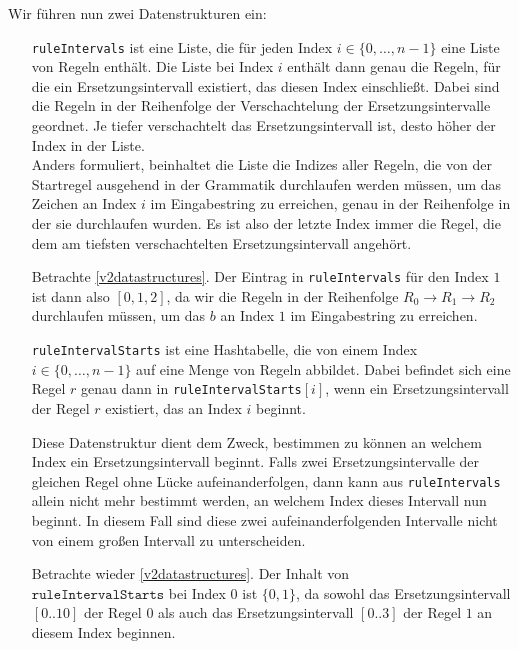 Wir führen nun zwei Datenstrukturen ein: 
\begin{itemize}[leftmargin=10em]
	\item[\texttt{ruleIntervals}] ist eine Liste, die für jeden Index $i \in \{0, \dots, n - 1\}$ eine Liste von Regeln enthält. Die Liste bei Index $i$ enthält dann genau die Regeln, für die ein Ersetzungsintervall existiert, das diesen Index einschließt. Dabei sind die Regeln in der Reihenfolge der Verschachtelung der Ersetzungsintervalle geordnet. Je tiefer verschachtelt das Ersetzungsintervall ist, desto höher der Index in der Liste.\\ 
	Anders formuliert, beinhaltet die Liste die Indizes aller Regeln, die von der Startregel ausgehend in der Grammatik durchlaufen werden müssen, um das Zeichen an Index $i$ im Eingabestring zu erreichen, genau in der Reihenfolge in der sie durchlaufen wurden. Es ist also der letzte Index immer die Regel, die dem am tiefsten verschachtelten Ersetzungsintervall angehört. 
	
	Betrachte \autoref{v2datastructures}. Der Eintrag in \texttt{ruleIntervals} für den Index $1$ ist dann also $[0, 1, 2]$, da wir die Regeln in der Reihenfolge $R_0 \rightarrow R_1 \rightarrow R_2$ durchlaufen müssen, um das $b$ an Index $1$ im Eingabestring zu erreichen.
	
	\item[\texttt{ruleIntervalStarts}] ist eine Hashtabelle, die von einem Index $i \in \{0, \dots, n - 1\}$ auf eine Menge von Regeln abbildet. Dabei befindet sich eine Regel $r$ genau dann in \texttt{ruleIntervalStarts}$[i]$, wenn ein Ersetzungsintervall der Regel $r$ existiert, das an Index $i$ beginnt.
	
	Diese Datenstruktur dient dem Zweck, bestimmen zu können an welchem Index ein Ersetzungsintervall beginnt. Falls zwei Ersetzungsintervalle der gleichen Regel ohne Lücke aufeinanderfolgen, dann kann aus \texttt{ruleIntervals} allein nicht mehr bestimmt werden, an welchem Index dieses Intervall nun beginnt. In diesem Fall sind diese zwei aufeinanderfolgenden Intervalle nicht von einem großen Intervall zu unterscheiden.

    Betrachte wieder \autoref{v2datastructures}. Der Inhalt von\\
    $\texttt{ruleIntervalStarts}$ bei Index $0$ ist $\{0, 1\}$, da sowohl das Ersetzungsintervall $[0..10]$ der Regel $0$ als auch das Ersetzungsintervall $[0..3]$ der Regel $1$ an diesem Index beginnen. 
\end{itemize}



